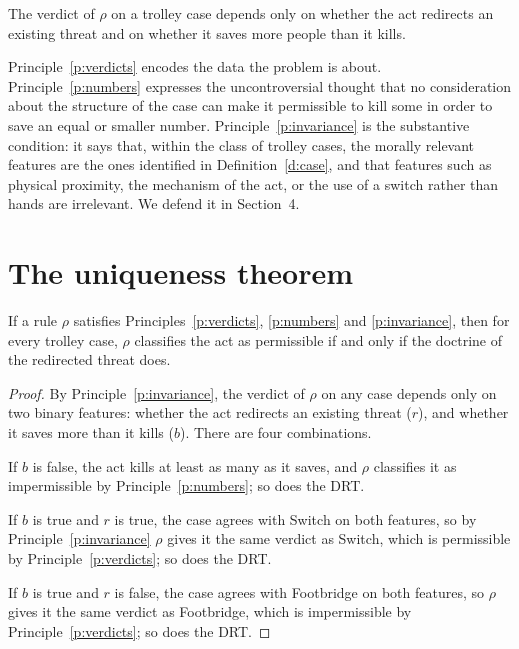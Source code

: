 \documentclass{situationist-preprint}
\begin{document}
\begin{principle}[Invariance]\label{p:invariance}
The verdict of $\rho$ on a trolley case depends only on whether the act redirects an existing threat and on whether it saves more people than it kills.
\end{principle}

Principle~\ref{p:verdicts} encodes the data the problem is about. Principle~\ref{p:numbers} expresses the uncontroversial thought that no consideration about the structure of the case can make it permissible to kill some in order to save an equal or smaller number. Principle~\ref{p:invariance} is the substantive condition: it says that, within the class of trolley cases, the morally relevant features are the ones identified in Definition~\ref{d:case}, and that features such as physical proximity, the mechanism of the act, or the use of a switch rather than hands are irrelevant. We defend it in Section~4.

\section{The uniqueness theorem}

\begin{theorem}\label{t:unique}
If a rule $\rho$ satisfies Principles~\ref{p:verdicts}, \ref{p:numbers} and \ref{p:invariance}, then for every trolley case, $\rho$ classifies the act as permissible if and only if the doctrine of the redirected threat does.
\end{theorem}

\begin{proof}
By Principle~\ref{p:invariance}, the verdict of $\rho$ on any case depends only on two binary features: whether the act redirects an existing threat ($r$), and whether it saves more than it kills ($b$). There are four combinations.

If $b$ is false, the act kills at least as many as it saves, and $\rho$ classifies it as impermissible by Principle~\ref{p:numbers}; so does the DRT.

If $b$ is true and $r$ is true, the case agrees with Switch on both features, so by Principle~\ref{p:invariance} $\rho$ gives it the same verdict as Switch, which is permissible by Principle~\ref{p:verdicts}; so does the DRT.

If $b$ is true and $r$ is false, the case agrees with Footbridge on both features, so $\rho$ gives it the same verdict as Footbridge, which is impermissible by Principle~\ref{p:verdicts}; so does the DRT.
\end{proof}
\end{document}
